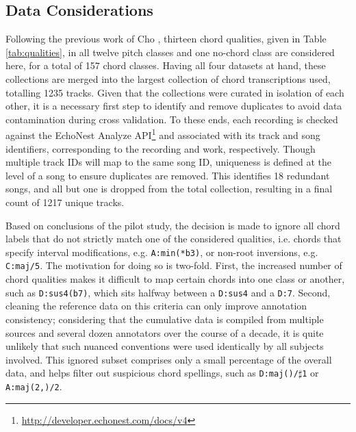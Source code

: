 \subsection{Data Considerations}
\label{subsec:data_considerations}
Following the previous work of Cho \cite{Cho2014}, thirteen chord qualities, given in Table \ref{tab:qualities}, in all twelve pitch classes and one no-chord class are considered here, for a total of 157 chord classes.
Having all four datasets at hand, these collections are merged into the largest collection of chord transcriptions used, totalling 1235 tracks.
Given that the collections were curated in isolation of each other, it is a necessary first step to identify and remove duplicates to avoid data contamination during cross validation.
To these ends, each recording is checked against the EchoNest Analyze API\footnote{\url{http://developer.echonest.com/docs/v4}} and associated with its track and song identifiers, corresponding to the recording and work, respectively.
Though multiple track IDs will map to the same song ID, uniqueness is defined at the level of a song to ensure duplicates are removed.
This identifies 18 redundant songs, and all but one is dropped from the total collection, resulting in a final count of 1217 unique tracks.

Based on conclusions of the pilot study, the decision is made to ignore all chord labels that do not strictly match one of the considered qualities, i.e. chords that specify interval modifications, e.g. \texttt{A:min(*b3)}, or non-root inversions, e.g. \texttt{C:maj/5}.
The motivation for doing so is two-fold.
First, the increased number of chord qualities makes it difficult to map certain chords into one class or another, such as \texttt{D:sus4(b7)}, which sits halfway between a \texttt{D:sus4} and a \texttt{D:7}.
Second, cleaning the reference data on this criteria can only improve annotation consistency; considering that the cumulative data is compiled from multiple sources and several dozen annotators over the course of a decade, it is quite unlikely that such nuanced conventions were used identically by all subjects involved.
This ignored subset comprises only a small percentage of the overall data, and helps filter out suspicious chord spellings, such as \texttt{D:maj()/$\sharp$1} or \texttt{A:maj(2,)/2}.

